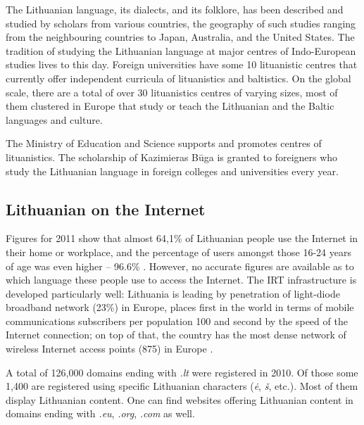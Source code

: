 \begin{multicols}{2}

The Lithuanian language, its dialects, and its folklore, has been described and studied by scholars from various countries, the geography of such studies ranging from the neighbouring countries to Japan, Australia, and the United States. The tradition of studying the Lithuanian language at major centres of Indo-European studies lives to this day. Foreign universities have some 10 lituanistic centres that currently offer independent curricula of lituanistics and baltistics. On the global scale, there are a total of over 30 lituanistics centres of varying sizes, most of them clustered in Europe that study or teach the Lithuanian and the Baltic languages and culture.

The Ministry of Education and Science supports and promotes centres of lituanistics. The scholarship of Kazimieras Būga is granted to foreigners who study the Lithuanian language in foreign colleges and universities every year.

\subsection{Lithuanian on the Internet}

 Figures for 2011 show that almost 64,1\% of Lithuanian people use the Internet in their home or workplace, and the percentage of users amongst those 16-24 years of age was even higher – 96.6\% \cite{stat}.  However, no accurate figures are available as to which language these people use to access the Internet. The IRT infrastructure is developed particularly well: Lithuania is leading by penetration of light-diode broadband network (23\%) in Europe, places first in the world in terms of mobile communications subscribers per population 100 and second by the speed of the Internet connection; on top of that, the country has the most dense network of wireless Internet access points (875) in Europe \cite{invest}.


A total of 126,000 domains ending with \textit{.lt}  were registered in 2010. Of those some 1,400 are registered using specific Lithuanian characters (\textit{ė}, \textit{š}, etc.). Most of them display Lithuanian content. One can find websites offering Lithuanian content in domains ending with \textit{.eu}, \textit{.org}, \textit{.com} as well.


\end{multicols}

